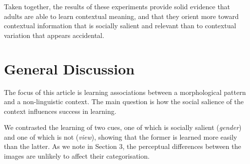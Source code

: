 \documentclass{frontiersSCNS} %
\begin{document}
Taken together, the results of these experiments provide solid evidence that adults are able to learn contextual meaning, and that they orient more toward contextual information that is socially salient and relevant than to contextual variation that appears accidental.





%
\section{General Discussion}

The focus of this article is learning associations between a morphological pattern and a non-linguistic context. The main question is how the social salience of the context influences success in learning. 

We contrasted the learning of two cues, one of which is socially salient (\emph{gender}) and one of which is not (\emph{view}), showing that the former is learned more easily than the latter. As we note in Section 3, the perceptual differences between the images are unlikely to affect their categorisation.
\end{document}
